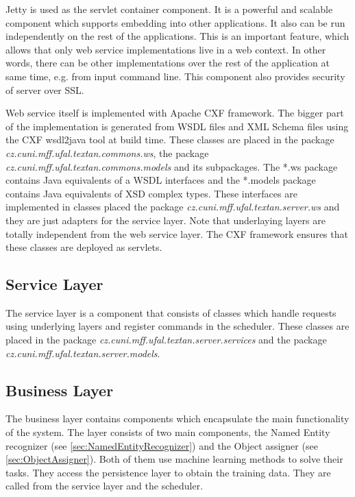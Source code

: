 Jetty is used as the servlet container component. It is a powerful and scalable
component which supports embedding into other applications.
It also can be run independently on the rest of the applications. This is an
important feature, which allows that only web service implementations live in a
web context. In other words, there can be other implementations over the rest of
the application at same time, e.g. from input command line. This component also
provides security of \textan{} server over SSL.

Web service itself is implemented with Apache CXF framework. The bigger part of
the implementation is generated from WSDL files and XML Schema files using the
CXF wsdl2java tool at build time. These classes are placed in the package
\emph{cz.\-cuni.\-mff.\-ufal.\-textan.\-commons.\-ws}, the package
\emph{cz.\-cuni.\-mff.\-ufal.\-textan.\-commons.\-models} and its subpackages.
The *.ws package contains Java equivalents of a WSDL interfaces and the *.models
package contains Java equivalents of XSD complex types. These interfaces are
implemented in classes placed the package \emph{cz.\-cuni.\-mff.\-ufal.\-textan.\-server.\-ws}
and they are just adapters for the service layer. Note that underlaying layers
are totally independent from the web service layer. The CXF framework ensures
that these classes are deployed as servlets.

\subsection{Service Layer}
The service layer is a component that consists of classes which handle requests
using underlying layers and register commands in the scheduler. These classes
are placed in the package \emph{cz.\-cuni.\-mff.\-ufal.\-textan.\-server.\-services}
and the package \emph{cz.\-cuni.\-mff.\-ufal.\-textan.\-server.\-models}.


\subsection{Business Layer}
The business layer contains components which encapsulate the main functionality
of the system. The layer consists of two main components, the Named Entity
recognizer (see \autoref{sec:NamedEntityRecognizer}) and the Object assigner 
(see \autoref{sec:ObjectAssigner}). Both of them use machine learning methods to
solve their tasks. They access the persistence layer to obtain the training
data. They are called from the service layer and the scheduler.

